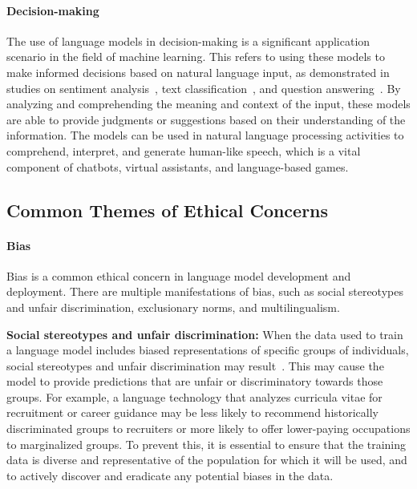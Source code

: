 \paragraph{Decision-making}
The use of language models in decision-making is a significant application scenario in the field of machine learning. This refers to using these models to make informed decisions based on natural language input, as demonstrated in studies on sentiment analysis~\cite{zhang2018deep}, text classification~\cite{minaee2021deep}, and question answering~\cite{abbasiantaeb2021text}. By analyzing and comprehending the meaning and context of the input, these models are able to provide judgments or suggestions based on their understanding of the information. The models can be used in natural language processing activities to comprehend, interpret, and generate human-like speech, which is a vital component of chatbots, virtual assistants, and language-based games.

\subsection{Common Themes of Ethical Concerns}

\paragraph{Bias}
Bias is a common ethical concern in language model development and deployment. There are multiple manifestations of bias, such as social stereotypes and unfair discrimination, exclusionary norms, and multilingualism.

\textbf{Social stereotypes and unfair discrimination:} When the data used to train a language model includes biased representations of specific groups of individuals, social stereotypes and unfair discrimination may result~\cite{weidinger2021ethical}. This may cause the model to provide predictions that are unfair or discriminatory towards those groups. For example, a language technology that analyzes curricula vitae for recruitment or career guidance may be less likely to recommend historically discriminated groups to recruiters or more likely to offer lower-paying occupations to marginalized groups. To prevent this, it is essential to ensure that the training data is diverse and representative of the population for which it will be used, and to actively discover and eradicate any potential biases in the data.

